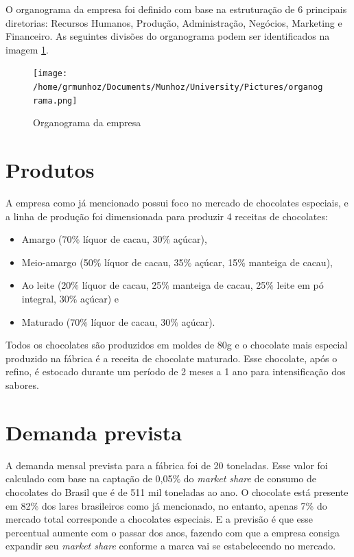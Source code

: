 \documentclass[
	12pt,				%
	openright,			%
	oneside,			%
	a4paper,			%
	english,			%
	french,				%
	spanish,			%
	brazil				%
	]{abntex2}
\begin{document}
O organograma da empresa foi definido com base na estruturação de 6 principais diretorias: Recursos Humanos, Produção, Administração, Negócios, Marketing e Financeiro. As seguintes divisões do organograma podem ser identificados na imagem \ref{orga}. 

\begin{figure}[H]
\begin{center}
\caption{Organograma da empresa}
\texttt{[image: /home/grmunhoz/Documents/Munhoz/University/Pictures/organograma.png]} 
\label{orga}
\end{center}
\end{figure}

\section{Produtos}

A empresa como já mencionado possui foco no mercado de chocolates especiais, e a linha de produção foi dimensionada para produzir 4 receitas de chocolates:

\begin{itemize}
\item Amargo (70$\%$ líquor de cacau, 30$\%$ açúcar), 
\item Meio-amargo (50$\%$ líquor de cacau, 35$\%$ açúcar, 15$\%$ manteiga de cacau), 
\item Ao leite (20$\%$ líquor de cacau, 25$\%$ manteiga de cacau, 25$\%$ leite em pó integral, 30$\%$ açúcar) e 
\item Maturado (70$\%$ líquor de cacau, 30$\%$ açúcar).
\end{itemize}

Todos os chocolates são produzidos em moldes de 80g e o chocolate mais especial produzido na fábrica é a receita de chocolate maturado. Esse chocolate, após o refino, é estocado durante um período de 2 meses a 1 ano para intensificação dos sabores.

\section{Demanda prevista}

A demanda mensal prevista para a fábrica foi de 20 toneladas. Esse valor foi calculado com base na captação de 0,05$\%$ do \textit{market share} de consumo de chocolates do Brasil que é de 511 mil toneladas ao ano. O chocolate está presente em 82$\%$ dos lares brasileiros como já mencionado, no entanto, apenas 7$\%$ do mercado total corresponde a chocolates especiais. E a previsão é que esse percentual aumente com o passar dos anos, fazendo com que a empresa consiga expandir seu \textit{market share} conforme a marca vai se estabelecendo no mercado. 
\end{document}
